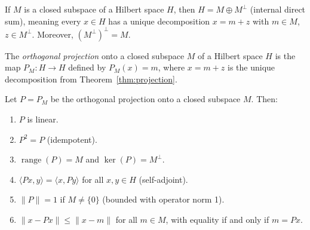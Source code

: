 \documentclass[11pt,a4paper]{article}
\begin{document}
\begin{keyresult}[title={Orthogonal Decomposition}]
If $M$ is a closed subspace of a Hilbert space $H$, then
$H = M \oplus M^\perp$ (internal direct sum), meaning every $x \in H$
has a unique decomposition $x = m + z$ with $m \in M$,
$z \in M^\perp$. Moreover, $(M^\perp)^\perp = M$.
\end{keyresult}

\begin{definition}
\label{def:projection-operator}
The \emph{orthogonal projection} onto a closed subspace $M$ of a Hilbert
space $H$ is the map $P_M \colon H \to H$ defined by $P_M(x) = m$,
where $x = m + z$ is the unique decomposition from
Theorem~\ref{thm:projection}.
\end{definition}

\begin{proposition}
\label{prop:projection-props}
Let $P = P_M$ be the orthogonal projection onto a closed subspace $M$.
Then:
\begin{enumerate}[label=(\roman*)]
    \item $P$ is linear.
    \item $P^2 = P$ (idempotent).
    \item $\operatorname{range}(P) = M$ and $\ker(P) = M^\perp$.
    \item $\langle Px, y \rangle = \langle x, Py \rangle$ for all
          $x, y \in H$ (self-adjoint).
    \item $\|P\| = 1$ if $M \neq \{0\}$ (bounded with operator norm 1).
    \item $\|x - Px\| \leq \|x - m\|$ for all $m \in M$, with equality
          if and only if $m = Px$.
\end{enumerate}
\end{proposition}
\end{document}

